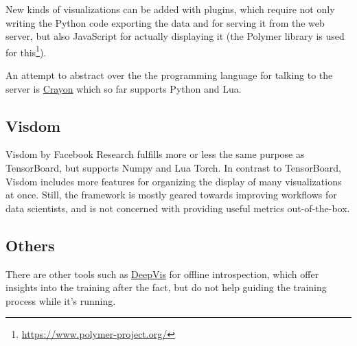     New kinds of visualizations can be added with plugins, which require not
    only writing the Python code exporting the data and for serving it from
    the web server, but also JavaScript for actually displaying it (the
    Polymer library is used for this\footnote{\url{https://www.polymer-project.org/}}).

    An attempt to abstract over the the programming language for talking to
    the server is \href{https://github.com/torrvision/crayon}{Crayon} which
    so far supports Python and Lua.

    \hypertarget{visdom}{%
    \subsection*{Visdom}\label{visdom}}

    Visdom by Facebook Research fulfills more or less the same purpose as
    TensorBoard, but supports Numpy and Lua Torch. In contrast to
    TensorBoard, Visdom includes more features for organizing the display of
    many visualizations at once. Still, the framework is mostly geared
    towards improving workflows for data scientists, and is not concerned
    with providing useful metrics out-of-the-box.

    \hypertarget{others}{%
    \subsection*{Others}\label{others}}

    There are other tools such as
    \href{http://yosinski.com/deepvis}{DeepVis} for offline introspection,
    which offer insights into the training after the fact, but do not help
    guiding the training process while it's running.
